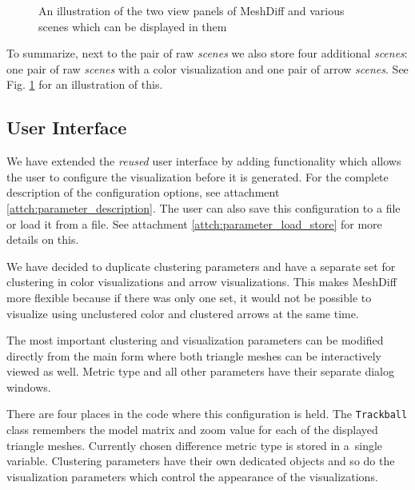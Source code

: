 \begin{figure}[h]
	\centering
	\def\svgwidth{\textwidth}
	
	\caption[Scenes Explained]{An illustration of the two view panels of MeshDiff and various scenes which can be displayed in them}
	\label{fig:illustration-scenes_explained}
\end{figure}

To summarize, next to the pair of raw {\it scenes} we also store four additional {\it scenes}: one pair of raw {\it scenes} with a color visualization and one pair of arrow {\it scenes}. See Fig. \ref{fig:illustration-scenes_explained} for an illustration of this.

\subsection{User Interface}
\label{subsec:implementation-architecture-user_interface}

We have extended the {\it reused} user interface by adding functionality which allows the user to configure the visualization before it is generated. For the complete description of the configuration options, see attachment \ref{attch:parameter_description}. The user can also save this configuration to a file or load it from a file. See attachment \ref{attch:parameter_load_store} for more details on this.

We have decided to duplicate clustering parameters and have a separate set for clustering in color visualizations and arrow visualizations. This makes MeshDiff more flexible because if there was only one set, it would not be possible to visualize using unclustered color and clustered arrows at the same time.

The most important clustering and visualization parameters can be modified directly from the main form where both triangle meshes can be interactively viewed as well. Metric type and all other parameters have their separate dialog windows.

There are four places in the code where this configuration is held. The \verb+Trackball+ class remembers the model matrix and zoom value for each of the displayed triangle meshes. Currently chosen difference metric type is stored in a~single variable. Clustering parameters have their own dedicated objects and so do the visualization parameters which control the appearance of the visualizations.

